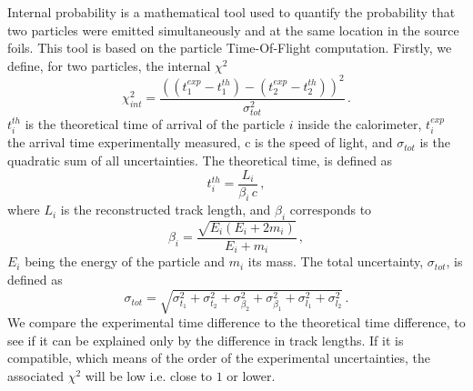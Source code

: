 Internal probability is a mathematical tool used to quantify the probability that two particles were emitted simultaneously and at the same location in the source foils.
This tool is based on the particle Time-Of-Flight computation.
Firstly, we define, for two particles, the internal $\chi^{2}$
\begin{equation}
  \chi^{2}_{int}=\frac{((t^{exp}_{1} - t^{th}_{1}) - (t^{exp}_{2} - t^{th}_{2}))^{2}}{\sigma_{tot}^{2}}\,.
  \label{eq:int_chi2}
\end{equation}
$t^{th}_{i}$ is the theoretical time of arrival of the particle $i$ inside the calorimeter, $t^{exp}_{i}$ the arrival time experimentally measured, c is the speed of light, and $\sigma_{tot}$ is the quadratic sum of all uncertainties.
The theoretical time, is defined as
\begin{equation}
  t^{th}_{i}=\frac{L_{i}}{\beta_{i}\,c}\,,
  \label{eq:th_time}
\end{equation}
where $L_{i}$ is the reconstructed track length, and $\beta_{i}$ corresponds to
\begin{equation}
  \beta_{i}=\frac{\sqrt{E_{i}(E_{i} + 2m_{i})}}{E_{i} + m_{i}}\,,
  \label{eq:beta_i}
\end{equation}
$E_{i}$ being the energy of the particle and $m_{i}$ its mass.
The total uncertainty, $\sigma_{tot}$, is defined as
\begin{equation}
  \sigma_{tot}=\sqrt{\sigma_{t_{1}}^{2}+\sigma_{t_{2}}^{2}+\sigma_{\beta_{2}}^{2}+\sigma_{\beta_{1}}^{2}+\sigma_{l_{1}}^{2}+\sigma_{l_{2}}^{2}} \,.
  \label{eq:sigma_tot}
\end{equation}
We compare the experimental time difference to the theoretical time difference, to see if it can be explained only by the difference in track lengths.
If it is compatible, which means of the order of the experimental uncertainties, the associated $\chi^{2}$ will be low i.e. close to $1$ or lower.

